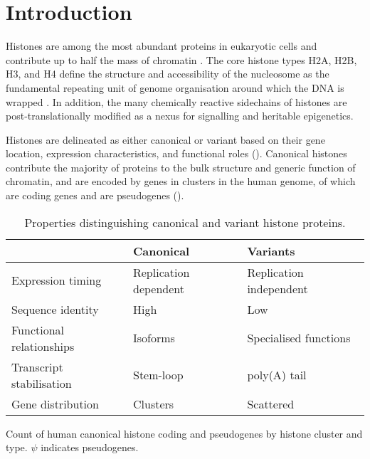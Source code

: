 \section{Introduction}

  Histones are among the most abundant proteins in eukaryotic cells
  and contribute up to half the mass of chromatin \citep{AlbertsMBoC}.
  The core histone types H2A, H2B, H3, and H4
  define the structure and accessibility of the nucleosome
  as the fundamental repeating unit of genome organisation
  around which the DNA is wrapped \citep{Luger1997structure}.
  In addition, the many chemically reactive sidechains of histones
  are post-translationally modified
  as a nexus for signalling and heritable epigenetics.

  Histones are delineated as either canonical or variant based on
  their gene location, expression characteristics,
  and functional roles ().
  Canonical histones contribute the majority of proteins to
  the bulk structure and generic function of chromatin,
  and are encoded by \TotalCoreGenes{} genes in \NumberOfClusters{}
  clusters in the human genome,
  of which \TotalCoreCodingGenes{} are coding genes and \TotalCorePseudoGenes{}
  are pseudogenes ().

  \begin{table}
    \caption{Properties distinguishing canonical and variant histone proteins.}
    \label{tab:typical-histone-differences}
    \centering
    \begin{tabular}{l l l}
      \toprule
      \null                     & Canonical             & Variants \\
      \midrule
      Expression timing         & Replication dependent & Replication independent \\
      Sequence identity         & High                  & Low \\
      Functional relationships  & Isoforms              & Specialised functions \\
      Transcript stabilisation  & Stem-loop             & poly(A) tail \\
      Gene distribution         & Clusters              & Scattered \\
      \bottomrule
    \end{tabular}
  \end{table}

  \begin{table}
    \caption{Count of human canonical histone coding and pseudogenes by
             histone cluster and type. $\psi$ indicates pseudogenes.}
    \label{tab:histone-gene-count}
    \centering
    
  \end{table}

